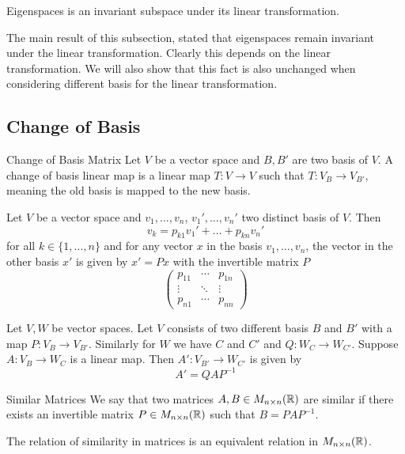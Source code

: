 \documentclass[a4paper]{article}
\begin{document}
\begin{thm}{}{} Eigenspaces is an invariant subspace under its linear transformation. 
\end{thm}

The main result of this subsection, stated that eigenspaces remain invariant under the linear transformation. Clearly this depends on the linear transformation. We will also show that this fact is also unchanged when considering different basis for the linear transformation. 

\subsection{Change of Basis}
\begin{defn}{Change of Basis Matrix}{} Let $V$ be a vector space and $B,B'$ are two basis of $V$. A change of basis linear map is a linear map $T:V\to V$ such that $T:V_B\to V_{B'}$, meaning the old basis is mapped to the new basis. 
\end{defn}

\begin{prp}{}{} Let $V$ be a vector space and $v_1,\dots,v_n$, $v_1',\dots,v_n'$ two distinct basis of $V$. Then $$v_k=p_{k1}v_1'+\dots+p_{kn}v_n'$$ for all $k\in\{1,\dots,n\}$ and for any vector $x$ in the basis $v_1,\dots,v_n$, the vector in the other basis $x'$ is given by $x'=Px$ with the invertible matrix $P$ $$\begin{pmatrix}
p_{11}&\cdots&p_{1n}\\
\vdots&\ddots&\vdots\\
p_{n1}&\cdots&p_{nn}
\end{pmatrix}$$
\end{prp}

\begin{thm}{}{} Let $V,W$ be vector spaces. Let $V$ consists of two different basis $B$ and $B'$ with a map $P:V_B\to V_{B'}$. Similarly for $W$ we have $C$ and $C'$ and $Q:W_C\to W_{C'}$. Suppose $A:V_B\to W_C$ is a linear map. Then $A':V_{B'}\to W_{C'}$ is given by $$A'=QAP^{-1}$$
\end{thm}

\begin{defn}{Similar Matrices}{} We say that two matrices $A,B\in M_{n\times n}(\mathbb{R})$ are similar if there exists an invertible matrix $P\in M_{n\times n}(\mathbb{R})$ such that $B=PAP^{-1}$. 
\end{defn}

\begin{lmm}{}{} The relation of similarity in matrices is an equivalent relation in $M_{n\times n}(\mathbb{R})$. 
\end{lmm}
\end{document}
